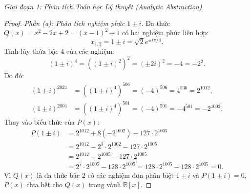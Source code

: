 \documentclass{article}
\begin{document}
\vspace{0.5em}\noindent\emph{Giai đoạn 1: Phân tích Toán học Lý thuyết (Analytic Abstraction)}

\begin{proof}
\emph{Phần (a): Phân tích nghiệm phức $1 \pm i$.}
Đa thức $Q(x) = x^2 - 2x + 2 = (x - 1)^2 + 1$ có hai nghiệm phức liên hợp:
\begin{equation}
    x_{1,2} = 1 \pm i = \sqrt{2} e^{\pm i\pi/4}.
\end{equation}
Tính lũy thừa bậc 4 của các nghiệm:
\begin{equation}
    (1 \pm i)^4 = \left((1 \pm i)^2\right)^2 = (\pm 2i)^2 = -4 = -2^2.
\end{equation}
Do đó:
\begin{align}
    (1 \pm i)^{2024} &= \left((1 \pm i)^4\right)^{506} = (-4)^{506} = 4^{506} = 2^{1012}, \\
    (1 \pm i)^{2004} &= \left((1 \pm i)^4\right)^{501} = (-4)^{501} = -4^{501} = -2^{1002}.
\end{align}
Thay vào biểu thức của $P(x)$:
\begin{align}
    P(1 \pm i) &= 2^{1012} + 8(-2^{1002}) - 127 \cdot 2^{1005} \nonumber \\
    &= 2^{1012} - 2^3 \cdot 2^{1002} - 127 \cdot 2^{1005} \nonumber \\
    &= 2^{1012} - 2^{1005} - 127 \cdot 2^{1005} \nonumber \\
    &= 2^7 \cdot 2^{1005} - 128 \cdot 2^{1005} = 128 \cdot 2^{1005} - 128 \cdot 2^{1005} = 0.
\end{align}
Vì $Q(x)$ là đa thức bậc 2 có các nghiệm đơn phân biệt $1 \pm i$ và $P(1 \pm i) = 0$, $P(x)$ chia hết cho $Q(x)$ trong vành $\mathbb{R}[x]$.


\end{proof}
\end{document}

